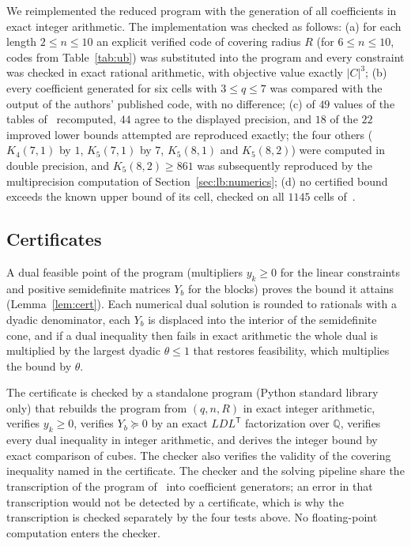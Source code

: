 \documentclass[11pt]{amsart}
\newcommand{\Kq}[3]{K_{#1}(#2,#3)}
\begin{document}
We reimplemented the reduced program with the generation of all
coefficients in exact integer arithmetic. The implementation was checked
as follows: (a) for each length $2\le n\le 10$ an explicit verified code of
covering radius $R$ (for $6\le n\le 10$, codes from Table~\ref{tab:ub})
was substituted into the program and every constraint was checked in exact
rational arithmetic, with objective value exactly $|C|^3$; (b) every
coefficient generated for six cells with $3\le q\le 7$ was compared with
the output of the authors' published code, with no difference; (c) of
$49$ values of the tables of~\cite{GijswijtPolak} recomputed, $44$ agree to
the displayed precision, and $18$ of the $22$ improved lower bounds
attempted are reproduced exactly; the four others ($\Kq{4}{7}{1}$ by $1$,
$\Kq{5}{7}{1}$ by $7$, $\Kq{5}{8}{1}$ and $\Kq{5}{8}{2}$) were computed in
double precision, and $\Kq{5}{8}{2}\ge 861$ was subsequently reproduced by
the multiprecision computation of Section~\ref{sec:lb:numerics}; (d) no
certified bound exceeds the known upper bound of its cell, checked on all
$1145$ cells of~\cite{Keri}.

\subsection{Certificates}\label{sec:lb:cert}

A dual feasible point of the program (multipliers $y_k\ge 0$ for the linear
constraints and positive semidefinite matrices $Y_b$ for the blocks) proves
the bound it attains (Lemma~\ref{lem:cert}). Each numerical dual solution
is rounded to rationals with a dyadic denominator, each $Y_b$ is displaced
into the interior of the semidefinite cone, and if a dual inequality then
fails in exact arithmetic the whole dual is multiplied by the largest
dyadic $\theta\le 1$ that restores feasibility, which multiplies the bound
by $\theta$.

The certificate is checked by a standalone program (Python standard
library only) that rebuilds the program from $(q,n,R)$ in exact integer
arithmetic, verifies $y_k\ge 0$, verifies $Y_b\succeq 0$ by an exact
$LDL^{\mathsf T}$ factorization over $\mathbb{Q}$, verifies every dual
inequality in integer arithmetic, and derives the integer bound by exact
comparison of cubes. The checker also verifies the validity of the
covering inequality named in the certificate. The checker and the solving
pipeline share the transcription of the program
of~\cite{GijswijtPolak} into coefficient generators; an error in that
transcription would not be detected by a certificate, which is why the
transcription is checked separately by the four tests above. No
floating-point computation enters the checker.
\end{document}
